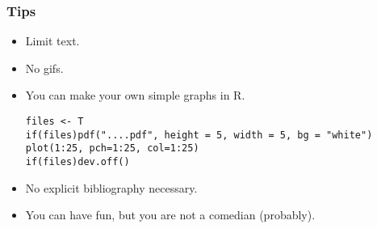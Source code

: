\documentclass[10pt]{beamer}
\begin{document}

\begin{frame}[fragile]\frametitle{Tips}
\begin{itemize}
\item Limit text.
\item No gifs.
\item You can make your own simple graphs in R.
\begin{verbatim}
files <- T
if(files)pdf("....pdf", height = 5, width = 5, bg = "white")
plot(1:25, pch=1:25, col=1:25)
if(files)dev.off()
\end{verbatim}
\item No explicit bibliography necessary.
\item You can have fun, but you are not a comedian (probably).
\end{itemize}
\end{frame}


\end{document}
